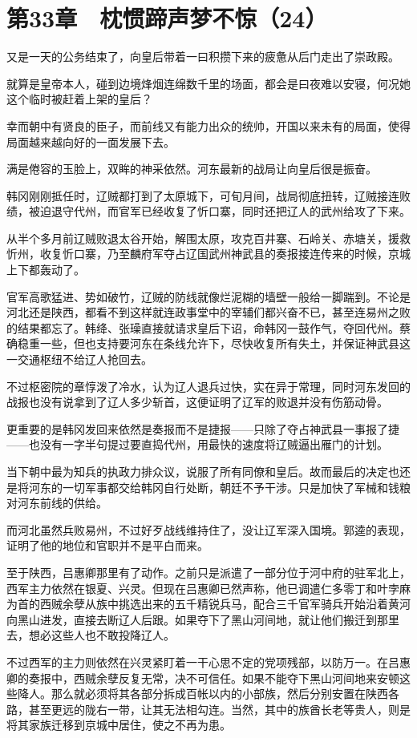 \section{第33章　枕惯蹄声梦不惊（24）}

又是一天的公务结束了，向皇后带着一曰积攒下来的疲惫从后门走出了崇政殿。

就算是皇帝本人，碰到边境烽烟连绵数千里的场面，都会是曰夜难以安寝，何况她这个临时被赶着上架的皇后？

幸而朝中有贤良的臣子，而前线又有能力出众的统帅，开国以来未有的局面，使得局面越来越向好的一面发展下去。

满是倦容的玉脸上，双眸的神采依然。河东最新的战局让向皇后很是振奋。

韩冈刚刚抵任时，辽贼都打到了太原城下，可旬月间，战局彻底扭转，辽贼接连败绩，被迫退守代州，而官军已经收复了忻口寨，同时还把辽人的武州给攻了下来。

从半个多月前辽贼败退太谷开始，解围太原，攻克百井寨、石岭关、赤塘关，援救忻州，收复忻口寨，乃至麟府军夺占辽国武州神武县的奏报接连传来的时候，京城上下都轰动了。

官军高歌猛进、势如破竹，辽贼的防线就像烂泥糊的墙壁一般给一脚踹到。不论是河北还是陕西，都看不到这样就连政事堂中的宰辅们都兴奋不已，甚至连易州之败的结果都忘了。韩绛、张璪直接就请求皇后下诏，命韩冈一鼓作气，夺回代州。蔡确稳重一些，但也支持要河东在条线允许下，尽快收复所有失土，并保证神武县这一交通枢纽不给辽人抢回去。

不过枢密院的章惇泼了冷水，认为辽人退兵过快，实在异于常理，同时河东发回的战报也没有说拿到了辽人多少斩首，这便证明了辽军的败退并没有伤筋动骨。

更重要的是韩冈发回来依然是奏报而不是捷报——只除了夺占神武县一事报了捷——也没有一字半句提过要直捣代州，用最快的速度将辽贼逼出雁门的计划。

当下朝中最为知兵的执政力排众议，说服了所有同僚和皇后。故而最后的决定也还是将河东的一切军事都交给韩冈自行处断，朝廷不予干涉。只是加快了军械和钱粮对河东前线的供给。

而河北虽然兵败易州，不过好歹战线维持住了，没让辽军深入国境。郭逵的表现，证明了他的地位和官职并不是平白而来。

至于陕西，吕惠卿那里有了动作。之前只是派遣了一部分位于河中府的驻军北上，西军主力依然在银夏、兴灵。但现在吕惠卿已然声称，他已调遣仁多零丁和叶孛麻为首的西贼余孽从族中挑选出来的五千精锐兵马，配合三千官军骑兵开始沿着黄河向黑山进发，直接去断辽人后跟。如果夺下了黑山河间地，就让他们搬迁到那里去，想必这些人也不敢投降辽人。

不过西军的主力则依然在兴灵紧盯着一干心思不定的党项残部，以防万一。在吕惠卿的奏报中，西贼余孽反复无常，决不可信任。如果不能夺下黑山河间地来安顿这些降人。那么就必须将其各部分拆成百帐以内的小部族，然后分别安置在陕西各路，甚至更远的陇右一带，让其无法相勾连。当然，其中的族酋长老等贵人，则是将其家族迁移到京城中居住，使之不再为患。

